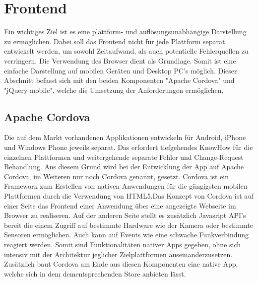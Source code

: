 \documentclass[10pt, conference, compsocconf]{IEEEtran}
\begin{document}
\section{Frontend}
Ein wichtiges Ziel ist es eine plattform- und aufl\"osungsunabh\"angige Darstellung zu erm\"oglichen. Dabei soll das Frontend nicht f\"ur jede Plattform separat entwickelt werden, um sowohl Zeitaufwand, als auch potentielle Fehlerquellen zu verringern. Die Verwendung des Browser dient als Grundlage. Somit ist eine einfache Darstellung auf mobilen Ger\"aten und Desktop PC's m\"oglich. Dieser Abschnitt befasst sich mit den beiden Komponenten "Apache Cordova" und "jQuery mobile", welche die Umsetzung der Anforderungen erm\"oglichen.

\subsection{Apache Cordova}
Die auf dem Markt vorhandenen Applikationen entwickeln f\"ur Android, iPhone und Windows Phone jeweils separat. Das erfordert tiefgehendes KnowHow f\"ur die einzelnen Plattformen und weitergehende separate Fehler und Change-Request Behandlung. Aus diesem Grund wird bei der Entwicklung der App auf Apache Cordova, im Weiteren nur noch Cordova genannt, gesetzt. Cordova ist ein Framework zum Erstellen von nativen Anwendungen f\"ur die g\"angigsten mobilen Plattformen durch die Verwendung von HTML5.Das Konzept von Cordova ist auf einer Seite das Frontend einer Anwendung \"uber eine angezeigte Webseite im Browser zu realiseren. Auf der anderen Seite stellt es zus\"atzlich Javasript API's bereit die einem Zugriff auf bestimmte Hardware wie der Kamera oder bestimmte Sensoren erm\"oglichen. Auch kann auf Events wie eine schwache Funkverbindung reagiert werden. Somit sind Funktionalit\"aten nativer Apps gegeben, ohne sich intensiv mit der Architektur jeglicher Zielplattformen auseinanderzusetzen. Zus\"atzlich baut Cordova am Ende aus diesen Komponenten eine native App, welche sich in dem dementsprechenden Store anbieten l\"asst.
\end{document}
